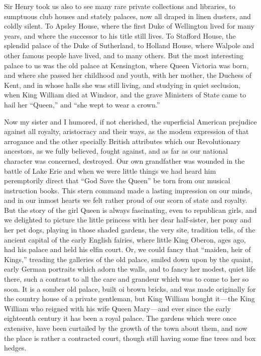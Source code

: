 \documentclass[12pt]{book}
\begin{document}
Sir Henry took us also to see many rare private collections and libraries, to
sumptuous club houses and stately palaces, now all draped in linen dusters, and
coldly silent. To Apsley House, where the first Duke of Wellington lived for
many years, and where the successor to his title still lives. To Stafford House, the
splendid palace of the Duke of Sutherland, to Holland House, where Walpole and
other famous people have lived, and to many others. But the most interesting
palace to us was the old palace at Kensington, where Queen Victoria was born,
and where she passed her childhood and youth, with her mother, the Duchess
of Kent, and in whose halls she was still living, and studying in quiet seclusion,
when King William died at Windsor, and the grave Ministers of State came to hail
her “Queen,” and “she wept to wear a crown.”

Now my sister and I humored, if not cherished, the superficial American prejudice against all royalty, aristocracy and their ways, as the modem expression of
that arrogance and the other specially British attributes which our Revolutionary
ancestors, as we fully believed, fought against, and as far as our national character
was concerned, destroyed. Our own grandfather was wounded in the battle of
Lake Erie and when we were little things we had heard him peremptorily direct
that “God Save the Queen” be torn from our musical instruction books. This
stern command made a lasting impression on our minds, and in our inmost hearts
we felt rather proud of our scorn of state and royalty. But the story of the girl
Queen is always fascinating, even to republican girls, and we delighted to picture
the little princess with her dear half‐sister, her pony and her pet dogs, playing
in those shaded gardens, the very site, tradition tells, of the ancient capital of
the early English fairies, where little King Oberon, ages ago, had his palace and
held his elfin court. Or, we could fancy that “maiden, heir of Kings,” treading
the galleries of the old palace, smiled down upon by the quaint, early German
portraits which adorn the walls, and to fancy her modest, quiet life there, such a
contrast to all the care and grandeur which was to come to her so soon. It is a
somber old palace, built oi brown bricks, and was made originally for the country
house of a private gentleman, but King William bought it — the King William who
reigned with his wife Queen Mary — and ever since the early eighteenth century
it has been a royal palace. The gardens which were once extensive, have been
curtailed by the growth of the town about them, and now the place is rather a
contracted court, though still having some fine trees and box hedges.
\end{document}
